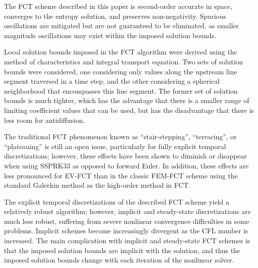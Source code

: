 The FCT scheme described in this paper is second-order accurate in space,
converges to the entropy solution, and preserves non-negativity.
Spurious oscillations are mitigated but are not guaranteed to be
eliminated, as smaller magnitude oscillations may exist within the imposed
solution bounds.

Local solution bounds imposed in the FCT algorithm were derived using the method
of characteristics and integral transport equation. Two sets of solution
bounds were considered, one considering only values along the upstream
line segment traversed in a time step, and the other considering a spherical
neighborhood that encompasses this line segment. The former set of solution
bounds is much tighter, which has the advantage that there is a smaller range
of limiting coefficient values that can be used, but has the disadvantage that
there is less room for antidiffusion.

The traditional FCT phenomenon known as ``stair-stepping'',
``terracing'', or ``plateauing'' is still an open issue, particularly for
fully explicit temporal discretizations; however, these effects
have been shown to diminish or disappear when using SSPRK33 as opposed
to forward Euler. In addition, these effects are less pronounced for EV-FCT
than in the classic FEM-FCT scheme using the standard Galerkin method as
the high-order method in FCT.

The explicit temporal discretizations of the described FCT scheme yield a
relatively robust algorithm; however, implicit and steady-state discretizations
are much less robust, suffering from severe nonlinear convergence difficulties
in some problems. Implicit schemes become increasingly divergent as the CFL
number is increased. The main complication with implicit and steady-state
FCT schemes is that the imposed solution bounds are implicit with the solution,
and thus the imposed solution bounds change with each iteration of the
nonlinear solver.
